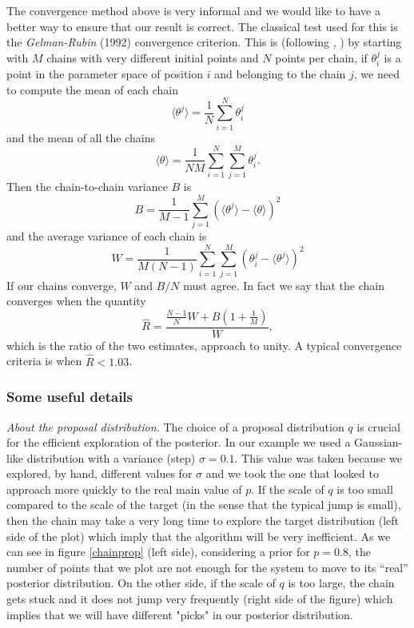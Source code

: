 \documentclass[onecolumn,           %
               showpacs,            %
               preprintnumbers,     %
               aps,                 %
               prl,          	    %
               letterpaper,             %
               superscriptaddress,      %
               nofootinbib,         %
               tightenlines,        %
               floats,floatfix      %
               ,usenatbib,
               ]{revtex4-1}
\begin{document}
The convergence method above is very informal and we would like to have a better way to ensure that our result is correct. The classical test used for this is the \textit{Gelman-Rubin} (1992) convergence criterion. This is (following \cite{LicV2}, \cite{AlanH}) by starting with $M$ chains with very different initial points and $N$ points per chain, if $\theta_i^j$ is a point in the parameter space of position $i$ and belonging to the chain $j$, we need to compute the mean of each chain 
\begin{equation}
\langle\theta^j\rangle =\frac{1}{N}\sum_{i=1}^N \theta_i^j
\end{equation}
and the mean of all the chains
\begin{equation}
\langle\theta\rangle =\frac{1}{NM}\sum_{i=1}^N\sum_{j=1}^M\theta_i^j.
\end{equation}
Then the chain-to-chain variance $B$ is
\begin{equation}
B=\frac{1}{M-1}\sum_{j=1}^M(\langle\theta^j\rangle-\langle\theta\rangle)^2
\end{equation}
and the average variance of each chain is
\begin{equation}
W=\frac{1}{M(N-1)}\sum_{i=1}^N\sum_{j=1}^M(\theta_i^j-\langle\theta^j\rangle)^2
\end{equation}
If our chains converge, $W$ and $B/N$ must agree. In fact we say that the chain converges when the quantity
\begin{equation}
\hat R=\frac{\frac{N-1}{N}W+B(1+\frac{1}{M})}{W},
\end{equation}
which is the ratio of the two estimates, approach to unity. A typical convergence criteria is when $\hat R<1.03$. 

\subsubsection{Some useful details}

\textit{About the proposal distribution.} The choice of a proposal distribution $q$ is crucial for the efficient exploration of the posterior. In our example we used a Gaussian-like distribution with a variance (step) $\sigma=0.1$. This value was taken because we explored, by hand, different values for $\sigma$ and we took the one that looked to approach more quickly to the real main value of $p$. If the scale of $q$ is too small compared to the scale of the target (in the sense that the typical jump is small), then the chain may take a very long time to explore the target distribution (left side of the plot) which imply that the algorithm will be very inefficient. As we can see in figure \ref{chainprop} (left side), considering a prior for $p=0.8$, the number of points that we plot are not enough for the system to move to its ``real'' posterior distribution. On the other side, if the scale of $q$ is too large, the chain gets stuck and it does not jump very frequently (right side of the figure) which implies that we will have different "picks" in our posterior distribution.    
\end{document}
